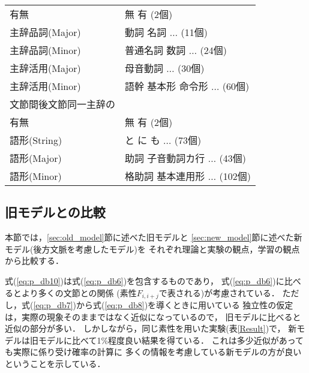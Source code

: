 \begin{table}[phtb]
\begin{center}
\begin{tabular}[c]{|l|l|}
      \q\q 有無 & 無 有 (2個) \\
      \q\q 主辞品詞(Major) & 動詞 名詞 $\ldots$ (11個) \\
      \q\q 主辞品詞(Minor) & 普通名詞 数詞 $\ldots$ (24個)\\
      \q\q 主辞活用(Major) & 母音動詞 $\ldots$ (30個) \\
      \q\q 主辞活用(Minor) & 語幹 基本形 命令形 $\ldots$ (60個) \\
      \hline
      文節間後文節同一主辞の & \\
      \q\q 有無 & 無 有 (2個) \\
      \q\q 語形(String) & と に も $\ldots$ (73個) \\
      \q\q 語形(Major) & 助詞 子音動詞カ行 $\ldots$ (43個)\\
      \q\q 語形(Minor) & 格助詞 基本連用形 $\ldots$ (102個)\\
      \hline
    \end{tabular}
  \end{center}
\end{table}

\subsection{旧モデルとの比較}
\label{sec:comparison_with_old_model}

本節では，\ref{sec:old_model}節に述べた旧モデルと
\ref{sec:new_model}節に述べた新モデル(後方文脈を考慮したモデル)を
それぞれ理論と実験の観点，学習の観点から比較する．

\vspace{1em}
\noindent
[{\bf 理論と実験の観点から}]

式(\ref{eq:p_db10})は式(\ref{eq:p_db6})を包含するものであり，
式(\ref{eq:p_db6})に比べるとより多くの文節との関係
(素性$F_{i,i+j}$で表される)が考慮されている．
ただし，式(\ref{eq:p_db7})から式(\ref{eq:p_db8})を導くときに用いている
独立性の仮定は，実際の現象そのままではなく近似になっているので，
旧モデルに比べると近似の部分が多い．
しかしながら，同じ素性を用いた実験(表\ref{Result})で，
新モデルは旧モデルに比べて1\%程度良い結果を得ている．
これは多少近似があっても実際に係り受け確率の計算に
多くの情報を考慮している新モデルの方が良いということを示している．

